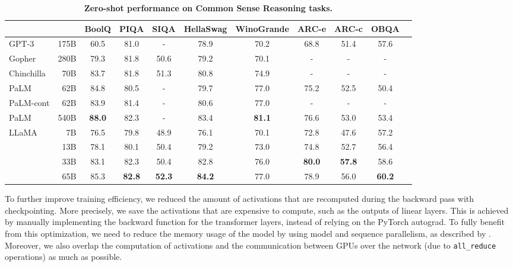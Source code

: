 \documentclass[11pt]{article}
\newcommand{\tbf}{\textbf}
\newcommand{\model}{LLaMA\xspace}
\begin{document}
\begin{table}[t!]
  \centering
  \setlength{\tabcolsep}{5pt}
  \begin{tabular}{lrccccccccc}
  \toprule
  & & BoolQ & PIQA & SIQA & \hspace{-0.3cm} HellaSwag \hspace{-0.2cm} & \hspace{-0.2cm} WinoGrande \hspace{-0.3cm} & ARC-e & ARC-c & OBQA \\
  \midrule
  GPT-3        & 175B & 60.5 & 81.0 & -    & 78.9 & 70.2 & 68.8 & 51.4 & 57.6 \\
  Gopher       & 280B & 79.3 & 81.8 & 50.6 & 79.2 & 70.1 & -    & -    & -    \\
  Chinchilla   & 70B  & 83.7 & 81.8 & 51.3 & 80.8 & 74.9 & -    & -    & -    \\
  PaLM         & 62B  & 84.8 & 80.5 & -    & 79.7 & 77.0 & 75.2 & 52.5 & 50.4 \\
  PaLM-cont    & 62B  & 83.9 & 81.4 & -    & 80.6 & 77.0 & -    & -    & -    \\
  PaLM         & 540B & \tbf{88.0} & 82.3 & - & 83.4 & \tbf{81.1} & 76.6 & 53.0 & 53.4 \\
  \midrule
  \multirow{4}{*}{\model}
     & 7B   & 76.5 & 79.8       & 48.9 & 76.1 & 70.1 & 72.8       & 47.6       & 57.2 \\
     & 13B  & 78.1 & 80.1       & 50.4 & 79.2 & 73.0 & 74.8       & 52.7       & 56.4 \\
     & 33B  & 83.1 & 82.3 & 50.4 & 82.8 & 76.0 & \tbf{80.0} & \tbf{57.8} & 58.6       \\
     & 65B  & 85.3 & \tbf{82.8}  & \tbf{52.3}  &  \tbf{84.2}    &  77.0    & 78.9  & 56.0  &   \tbf{60.2} \\
  \bottomrule
  \end{tabular}
  \caption{
  \textbf{Zero-shot performance on Common Sense Reasoning tasks.}
  \label{tab:commonsense}
  }
\end{table}

To further improve training efficiency, we reduced the amount of activations that are recomputed during the backward pass with checkpointing.
More precisely, we save the activations that are expensive to compute, such as the outputs of linear layers.
This is achieved by manually implementing the backward function for the transformer layers, instead of relying on the PyTorch autograd.
To fully benefit from this optimization, we need to reduce the memory usage of the model by using model and sequence parallelism, as described by \citet{korthikanti2022reducing}. Moreover, we also overlap the computation of activations and the communication between GPUs over the network (due to \texttt{all\_reduce} operations) as much as possible.
\end{document}
